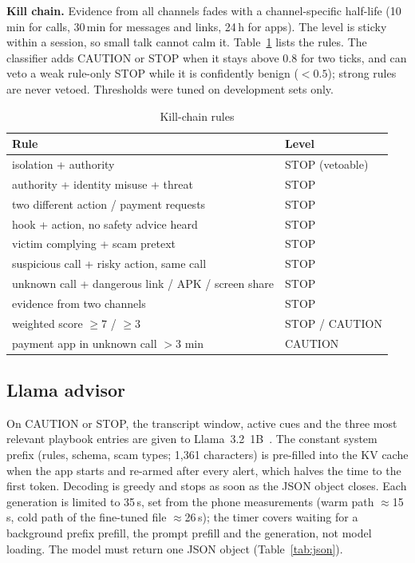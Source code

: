 \documentclass[conference]{IEEEtran}
\begin{document}
\textbf{Kill chain.} Evidence from all channels fades with a channel-specific half-life (10\,min for calls, 30\,min for messages and links, 24\,h for apps). The level is sticky within a session, so small talk cannot calm it. Table~\ref{tab:rules} lists the rules. The classifier adds CAUTION or STOP when it stays above 0.8 for two ticks, and can veto a weak rule-only STOP while it is confidently benign ($<0.5$); strong rules are never vetoed. Thresholds were tuned on development sets only.

\begin{table}[t]
\caption{Kill-chain rules}
\label{tab:rules}
\centering
\footnotesize
\setlength{\tabcolsep}{3pt}
\begin{tabular}{@{}ll@{}}
\toprule
Rule & Level \\
\midrule
isolation + authority & STOP (vetoable) \\
authority + identity misuse + threat & STOP \\
two different action / payment requests & STOP \\
hook + action, no safety advice heard & STOP \\
victim complying + scam pretext & STOP \\
suspicious call + risky action, same call & STOP \\
unknown call + dangerous link / APK / screen share & STOP \\
evidence from two channels & STOP \\
weighted score $\geq 7$ / $\geq 3$ & STOP / CAUTION \\
payment app in unknown call $>$3 min & CAUTION \\
\bottomrule
\end{tabular}
\end{table}

\subsection{Llama advisor}\label{sec:llama}
On CAUTION or STOP, the transcript window, active cues and the three most relevant playbook entries are given to Llama~3.2~1B~\cite{llama3}. The constant system prefix (rules, schema, scam types; 1,361 characters) is pre-filled into the KV cache when the app starts and re-armed after every alert, which halves the time to the first token. Decoding is greedy and stops as soon as the JSON object closes. Each generation is limited to 35\,s, set from the phone measurements (warm path $\approx$15\,s, cold path of the fine-tuned file $\approx$26\,s); the timer covers waiting for a background prefix prefill, the prompt prefill and the generation, not model loading. The model must return one JSON object (Table~\ref{tab:json}).
\end{document}
